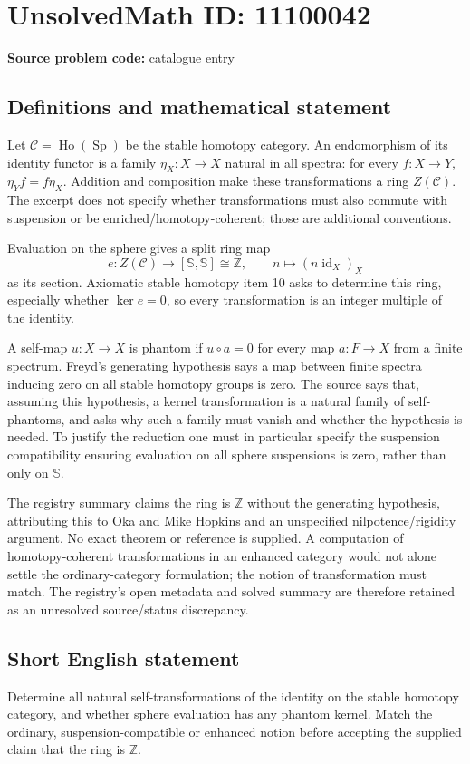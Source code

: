 \documentclass[11pt]{article}
\newcommand{\Z}{\mathbb{Z}}
\begin{document}
\section*{UnsolvedMath ID: 11100042}
\textbf{Source problem code:} catalogue entry
\subsection{Definitions and mathematical statement}
Let $\mathcal C=\operatorname{Ho}(\operatorname{Sp})$ be the stable homotopy category. An endomorphism of its identity functor is a family $\eta_X:X\to X$ natural in all spectra: for every $f:X\to Y$, $\eta_Yf=f\eta_X$. Addition and composition make these transformations a ring $Z(\mathcal C)$. The excerpt does not specify whether transformations must also commute with suspension or be enriched/homotopy-coherent; those are additional conventions.

Evaluation on the sphere gives a split ring map
\[
 e:Z(\mathcal C)\to[\mathbb S,\mathbb S]\cong\Z,
 \qquad n\longmapsto(n\operatorname{id}_X)_X
\]
as its section. Axiomatic stable homotopy item 10 asks to determine this ring, especially whether $\ker e=0$, so every transformation is an integer multiple of the identity.

A self-map $u:X\to X$ is phantom if $u\circ a=0$ for every map $a:F\to X$ from a finite spectrum. Freyd's generating hypothesis says a map between finite spectra inducing zero on all stable homotopy groups is zero. The source says that, assuming this hypothesis, a kernel transformation is a natural family of self-phantoms, and asks why such a family must vanish and whether the hypothesis is needed. To justify the reduction one must in particular specify the suspension compatibility ensuring evaluation on all sphere suspensions is zero, rather than only on $\mathbb S$.

The registry summary claims the ring is $\Z$ without the generating hypothesis, attributing this to Oka and Mike Hopkins and an unspecified nilpotence/rigidity argument. No exact theorem or reference is supplied. A computation of homotopy-coherent transformations in an enhanced category would not alone settle the ordinary-category formulation; the notion of transformation must match. The registry's open metadata and solved summary are therefore retained as an unresolved source/status discrepancy.
\subsection{Short English statement}
Determine all natural self-transformations of the identity on the stable homotopy category, and whether sphere evaluation has any phantom kernel. Match the ordinary, suspension-compatible or enhanced notion before accepting the supplied claim that the ring is $\Z$.
\end{document}
